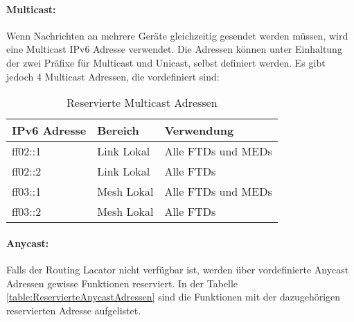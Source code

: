 \paragraph{Multicast:}
Wenn Nachrichten an mehrere Geräte gleichzeitig gesendet werden müssen, wird eine Multicast IPv6 Adresse verwendet. Die Adressen können unter Einhaltung der zwei Präfixe für Multicast und Unicast, selbst definiert werden. Es gibt jedoch 4 Multicast Adressen, die vordefiniert sind:

\begin{table}[H]
	\centering
	\begin{tabular}{|l|l|l|}
		\hline
		\textbf{IPv6 Adresse} & \textbf{Bereich} & \textbf{Verwendung} \\ \hline
		ff02::1               & Link Lokal       & Alle FTDs und MEDs  \\ \hline
		ff02::2               & Link Lokal       & Alle FTDs           \\ \hline
		ff03::1               & Mesh Lokal       & Alle FTDs und MEDs  \\ \hline
		ff03::2               & Mesh Lokal       & Alle FTDs           \\ \hline
	\end{tabular}
	\caption{Reservierte Multicast Adressen}
	\label{table:ReservierteMulticastAdressen}
\end{table}

\paragraph{Anycast:}
Falls der Routing Lacator nicht verfügbar ist, werden über vordefinierte Anycast Adressen gewisse Funktionen reserviert. In der Tabelle \ref{table:ReservierteAnycastAdressen} sind die Funktionen mit der dazugehörigen reservierten Adresse aufgelistet.

